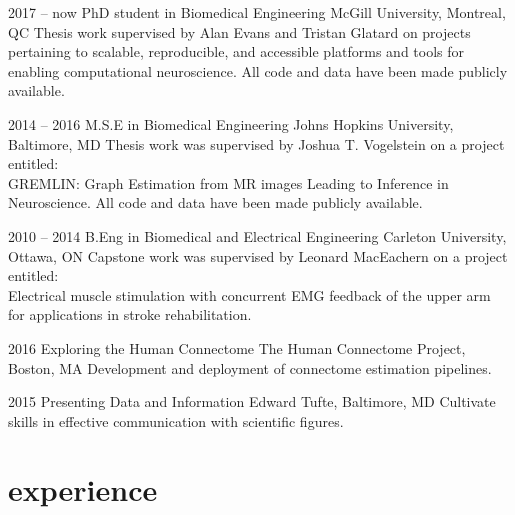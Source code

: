 \documentclass[]{friggeri-cv} %
\begin{document}
\begin{entrylist}


\entry
{2017 -- now}
{PhD student {\normalfont in Biomedical Engineering}}
{McGill University, Montreal, QC}
{Thesis work supervised by Alan Evans and Tristan Glatard on projects pertaining to scalable,
reproducible, and accessible platforms and tools for enabling computational neuroscience. All
code and data have been made publicly available.}


\entry
{2014 -- 2016}
{M.S.E {\normalfont in Biomedical Engineering}}
{Johns Hopkins University, Baltimore, MD}
{Thesis work was supervised by Joshua T. Vogelstein on a project entitled:\\GREMLIN:
Graph Estimation from MR images Leading to Inference in Neuroscience. All code and data have
been made publicly available.}


\entry
{2010 -- 2014}
{B.Eng {\normalfont in Biomedical and Electrical Engineering}}
{Carleton University, Ottawa, ON}
{Capstone work was supervised by Leonard MacEachern on a project entitled:\\Electrical
muscle stimulation with concurrent EMG feedback of the upper arm for applications in stroke
rehabilitation.}


\entry
{2016}
{Exploring the Human Connectome}
{The Human Connectome Project, Boston, MA}
{Development and deployment of connectome estimation pipelines.}


\entry
{2015}
{Presenting Data and Information}
{Edward Tufte, Baltimore, MD}
{Cultivate skills in effective communication with scientific figures.}

\end{entrylist}


\section{experience}
\end{document}
